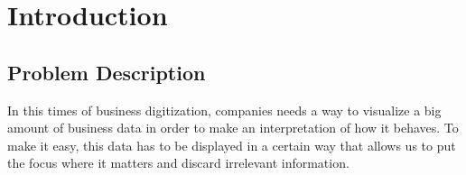 \documentclass[a4paper, 12pt, english]{book}
\begin{document}


\tableofcontents
\cleardoublepage
\listoffigures %



\cleardoublepage
\chapter{Introduction}
\label{sec:introduction} %




\section{Problem Description}
\label{sec:description}

In this times of business digitization, companies needs a way to visualize a big amount of business data in order to make an interpretation of how it behaves. To make it easy, this data has to be displayed in a certain way that allows us to put the focus where it matters and discard irrelevant information.
\end{document}
